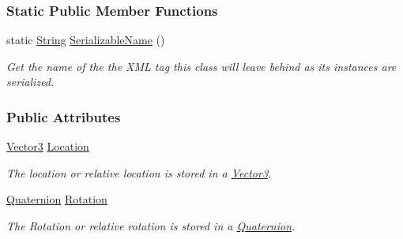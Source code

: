 \subsubsection*{Static Public Member Functions}
\begin{DoxyCompactItemize}
\item 
static \hyperlink{namespaceMezzanine_acf9fcc130e6ebf08e3d8491aebcf1c86}{String} \hyperlink{classMezzanine_1_1Transform_aa654b59db0a5ae99778cfb89ad8f7045}{SerializableName} ()
\begin{DoxyCompactList}\small\item\em Get the name of the the XML tag this class will leave behind as its instances are serialized. \item\end{DoxyCompactList}\end{DoxyCompactItemize}
\subsubsection*{Public Attributes}
\begin{DoxyCompactItemize}
\item 
\hypertarget{classMezzanine_1_1Transform_a93498c9bcba2298f199f9ab04671a944}{
\hyperlink{classMezzanine_1_1Vector3}{Vector3} \hyperlink{classMezzanine_1_1Transform_a93498c9bcba2298f199f9ab04671a944}{Location}}
\label{classMezzanine_1_1Transform_a93498c9bcba2298f199f9ab04671a944}

\begin{DoxyCompactList}\small\item\em The location or relative location is stored in a \hyperlink{classMezzanine_1_1Vector3}{Vector3}. \item\end{DoxyCompactList}\item 
\hypertarget{classMezzanine_1_1Transform_a4f41685c108f02fd4faad209b1a438ef}{
\hyperlink{classMezzanine_1_1Quaternion}{Quaternion} \hyperlink{classMezzanine_1_1Transform_a4f41685c108f02fd4faad209b1a438ef}{Rotation}}
\label{classMezzanine_1_1Transform_a4f41685c108f02fd4faad209b1a438ef}

\begin{DoxyCompactList}\small\item\em The Rotation or relative rotation is stored in a \hyperlink{classMezzanine_1_1Quaternion}{Quaternion}. \item\end{DoxyCompactList}\end{DoxyCompactItemize}


